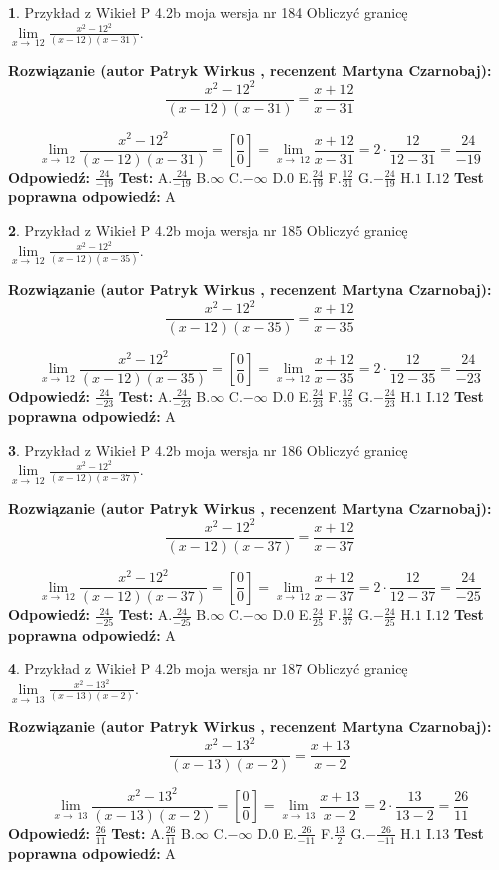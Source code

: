 \documentclass[12pt, a4paper]{article}
\theoremstyle{definition} %
\newtheorem{zad}{}
\newcommand{\zadStart}[1]{\begin{zad}#1\newline}
\newcommand{\zadStop}{\end{zad}}
\newcommand{\rozwStart}[2]{\noindent \textbf{Rozwiązanie (autor #1 , recenzent #2): }\newline}
\newcommand{\rozwStop}{\newline}
\newcommand{\odpStart}{\noindent \textbf{Odpowiedź:}\newline}
\newcommand{\odpStop}{\newline}
\newcommand{\testStart}{\noindent \textbf{Test:}\newline}
\newcommand{\testStop}{\newline}
\newcommand{\kluczStart}{\noindent \textbf{Test poprawna odpowiedź:}\newline}
\newcommand{\kluczStop}{\newline}
\begin{document}
\zadStart{Przykład z Wikieł P 4.2b moja wersja nr 184}
Obliczyć granicę $\lim\limits_{x\to\ 12}\frac{x^{2}-12^{2}}{(x-12)(x-31)}$.
\zadStop
\rozwStart{Patryk Wirkus}{Martyna Czarnobaj}
$$\frac{x^{2}-12^{2}}{(x-12)(x-31)}=\frac{x+12}{x-31}$$

$$\lim\limits_{x\to\ 12}\frac{x^{2}-12^{2}}{(x-12)(x-31)}=[\frac{0}{0}]=\lim\limits_{x\to\ 12}\frac{x+12}{x-31}=2 \cdot \frac{12}{12-31} = \frac{24}{-19}$$
\rozwStop
\odpStart
$\frac{24}{-19}$
\odpStop
\testStart
A.$\frac{24}{-19}$
B.$\infty$
C.$-\infty$
D.$0$
E.$\frac{24}{19}$
F.$\frac{12}{31}$
G.$-\frac{24}{19}$
H.$1$
I.$12$
\testStop
\kluczStart
A
\kluczStop



\zadStart{Przykład z Wikieł P 4.2b moja wersja nr 185}
Obliczyć granicę $\lim\limits_{x\to\ 12}\frac{x^{2}-12^{2}}{(x-12)(x-35)}$.
\zadStop
\rozwStart{Patryk Wirkus}{Martyna Czarnobaj}
$$\frac{x^{2}-12^{2}}{(x-12)(x-35)}=\frac{x+12}{x-35}$$

$$\lim\limits_{x\to\ 12}\frac{x^{2}-12^{2}}{(x-12)(x-35)}=[\frac{0}{0}]=\lim\limits_{x\to\ 12}\frac{x+12}{x-35}=2 \cdot \frac{12}{12-35} = \frac{24}{-23}$$
\rozwStop
\odpStart
$\frac{24}{-23}$
\odpStop
\testStart
A.$\frac{24}{-23}$
B.$\infty$
C.$-\infty$
D.$0$
E.$\frac{24}{23}$
F.$\frac{12}{35}$
G.$-\frac{24}{23}$
H.$1$
I.$12$
\testStop
\kluczStart
A
\kluczStop



\zadStart{Przykład z Wikieł P 4.2b moja wersja nr 186}
Obliczyć granicę $\lim\limits_{x\to\ 12}\frac{x^{2}-12^{2}}{(x-12)(x-37)}$.
\zadStop
\rozwStart{Patryk Wirkus}{Martyna Czarnobaj}
$$\frac{x^{2}-12^{2}}{(x-12)(x-37)}=\frac{x+12}{x-37}$$

$$\lim\limits_{x\to\ 12}\frac{x^{2}-12^{2}}{(x-12)(x-37)}=[\frac{0}{0}]=\lim\limits_{x\to\ 12}\frac{x+12}{x-37}=2 \cdot \frac{12}{12-37} = \frac{24}{-25}$$
\rozwStop
\odpStart
$\frac{24}{-25}$
\odpStop
\testStart
A.$\frac{24}{-25}$
B.$\infty$
C.$-\infty$
D.$0$
E.$\frac{24}{25}$
F.$\frac{12}{37}$
G.$-\frac{24}{25}$
H.$1$
I.$12$
\testStop
\kluczStart
A
\kluczStop



\zadStart{Przykład z Wikieł P 4.2b moja wersja nr 187}
Obliczyć granicę $\lim\limits_{x\to\ 13}\frac{x^{2}-13^{2}}{(x-13)(x-2)}$.
\zadStop
\rozwStart{Patryk Wirkus}{Martyna Czarnobaj}
$$\frac{x^{2}-13^{2}}{(x-13)(x-2)}=\frac{x+13}{x-2}$$

$$\lim\limits_{x\to\ 13}\frac{x^{2}-13^{2}}{(x-13)(x-2)}=[\frac{0}{0}]=\lim\limits_{x\to\ 13}\frac{x+13}{x-2}=2 \cdot \frac{13}{13-2} = \frac{26}{11}$$
\rozwStop
\odpStart
$\frac{26}{11}$
\odpStop
\testStart
A.$\frac{26}{11}$
B.$\infty$
C.$-\infty$
D.$0$
E.$\frac{26}{-11}$
F.$\frac{13}{2}$
G.$-\frac{26}{-11}$
H.$1$
I.$13$
\testStop
\kluczStart
A
\kluczStop
\end{document}
